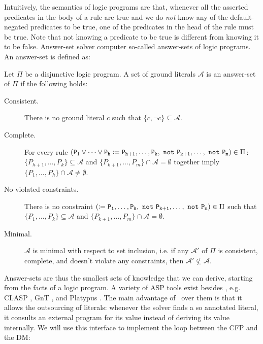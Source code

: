 Intuitively, the semantics of logic programs are that, whenever all the asserted predicates in the body of a rule are true and we do {\em not} know any of the default-negated predicates to be true, one of the predicates in the head of the rule must be true. Note that not knowing a predicate to be true is different from knowing it to be false. Answer-set solver computer so-called answer-sets of logic programs. An answer-set is defined as:

\begin{definition}
Let $\Pi$ be a disjunctive logic program. A set of ground literals $\mathcal{A}$ is an answer-set of $\Pi$ if the following holds:

\begin{description}
	\item[Consistent.] There is no ground literal $c$ such that $\{c, \neg c\} \subseteq \mathcal{A}$.
	\item[Complete.] For every rule $(\field{P_1 \vee \dots \vee P_h} \aspR \field{P_{h+1}, \dots, P_{k},\ not\ P_{k+1}, \dots,\ not\ P_{m}}) \in \Pi$:\\ $\{P_{h+1},\dots, P_k \} \subseteq \mathcal{A}$ and $\{P_{k+1},\dots, P_m \} \cap \mathcal{A} = \emptyset$ together imply $\{P_1,\dots, P_h \} \cap \mathcal{A} \neq \emptyset$.
	\item[No violated constraints.] There is no constraint $(\coloneq \mathtt{P_{1}, \dots, P_{k},\ not\ P_{k+1}, \dots,\ not\ P_{m}}) \in \Pi$ such that $\{P_1,\dots, P_k \} \subseteq \mathcal{A}$ and $\{P_{k+1},\dots, P_m \} \cap \mathcal{A} = \emptyset$.
	\item[Minimal.] $\mathcal{A}$ is minimal with respect to set inclusion, i.e. if any $\mathcal{A}'$ of $\Pi$ is consistent, complete, and doesn't violate any constraints, then $\mathcal{A}' \nsubseteq \mathcal{A}$.
\end{description}
\end{definition}

Answer-sets are thus the smallest sets of knowledge that we can derive, starting from the facts of a logic program. A variety of ASP tools exist besides \dlvhex, e.g. CLASP \cite{clasp}, GnT \cite{gnt}, and Platypus \cite{platypus}. The main advantage of \dlvhex\ over them is that it allows the outsourcing of literals: whenever the solver finds a so annotated literal, it consults an external program for its value instead of deriving its value internally. We will use this interface to implement the loop between the CFP and the DM: 

